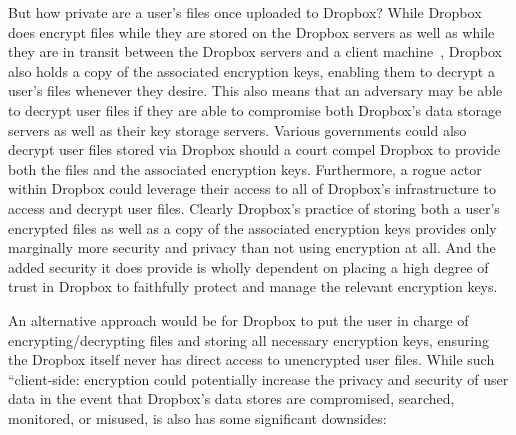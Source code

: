 But how private are a user's files once uploaded to Dropbox? While
Dropbox does encrypt files while they are stored on the Dropbox
servers as well as while they are in transit between the Dropbox
servers and a client machine~\cite{dropbox-security}, Dropbox also
holds a copy of the associated encryption keys, enabling them to
decrypt a user's files whenever they desire. This also means that an
adversary may be able to decrypt user files if they are able to
compromise both Dropbox's data storage servers as well as their key
storage servers. Various governments could also decrypt user files
stored via Dropbox should a court compel Dropbox to provide both the
files and the associated encryption keys. Furthermore, a rogue actor
within Dropbox could leverage their access to all of Dropbox's
infrastructure to access and decrypt user files. Clearly Dropbox's
practice of storing both a user's encrypted files as well as a copy of
the associated encryption keys provides only marginally more security
and privacy than not using encryption at all. And the added security
it does provide is wholly dependent on placing a high degree of trust
in Dropbox to faithfully protect and manage the relevant encryption
keys.

An alternative approach would be for Dropbox to put the user in charge
of encrypting/decrypting files and storing all necessary encryption
keys, ensuring the Dropbox itself never has direct access to
unencrypted user files. While such ``client-side: encryption could
potentially increase the privacy and security of user data in the
event that Dropbox's data stores are compromised, searched, monitored,
or misused, is also has some significant downsides:

